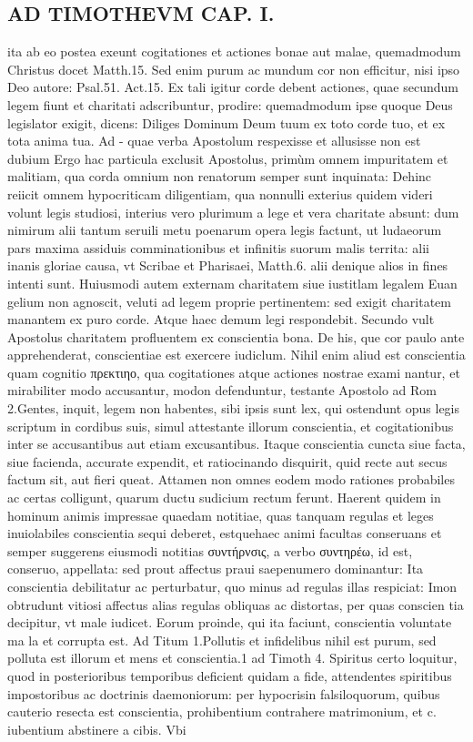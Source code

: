 \documentclass{article}
\begin{document}
\begin{pages}
\section*{AD TIMOTHEVM CAP. I. }
\marginpar{[ p.22 ]}\pstart ita ab eo postea exeunt cogitationes et actiones bonae aut malae, quemadmodum Christus docet Matth.15. Sed enim purum ac mundum cor non efficitur, nisi ipso Deo autore: Psal.51. Act.15. Ex tali igitur corde debent actiones, quae secundum legem fiunt et charitati adscribuntur, prodire: quemadmodum ipse quoque  Deus legislator exigit, dicens: Diliges Dominum Deum tuum ex toto corde tuo, et ex tota anima tua. Ad - quae verba Apostolum respexisse et allusisse non est dubium Ergo hac particula exclusit Apostolus, primùm omnem impuritatem et malitiam, qua corda omnium non renatorum semper sunt inquinata: Dehinc reiicit omnem hypocriticam diligentiam, qua nonnulli exterius quidem videri volunt legis studiosi, interius vero plurimum a lege et vera charitate absunt: dum nimirum alii tantum seruili metu poenarum opera legis factunt, ut ludaeorum pars maxima assiduis comminationibus et infinitis suorum malis territa: alii inanis gloriae causa, vt Scribae et Pharisaei, Matth.6. alii denique  alios in fines intenti sunt. Huiusmodi autem externam charitatem siue iustitlam legalem Euan gelium non agnoscit, veluti ad legem proprie pertinentem: sed exigit charitatem manantem ex puro corde. Atque  haec demum legi respondebit.  \pend\pstart Secundo vult Apostolus charitatem profluentem ex conscientia bona. De his, que cor paulo ante apprehenderat, conscientiae est exercere iudiclum. Nihil enim aliud est conscientia quam cognitio πρεκτιηο, qua cogitationes atque actiones nostrae exami nantur, et mirabiliter modo accusantur, modon defenduntur, testante Apostolo ad Rom 2.Gentes, inquit, legem non habentes, sibi ipsis sunt lex, qui ostendunt opus legis scriptum in cordibus suis, simul attestante illorum conscientia, et cogitationibus inter se   accusantibus aut etiam excusantibus. Itaque  conscientia cuncta siue facta, siue facienda, accurate expendit, et ratiocinando disquirit, quid recte aut secus factum sit, aut fieri queat. Attamen non omnes eodem modo rationes probabiles ac certas colligunt, quarum ductu sudicium rectum ferunt. Haerent quidem in hominum animis impressae quaedam notitiae, quas tanquam regulas et leges inuiolabiles conscientia sequi deberet, estquehaec animi facultas conseruans et semper suggerens eiusmodi notitias συντήρνσις, a verbo συντηρέω, id est, conseruo, appellata: sed prout affectus praui saepenumero dominantur: Ita conscientia debilitatur ac perturbatur, quo minus ad regulas illas respiciat: Imon obtrudunt vitiosi affectus alias regulas obliquas ac distortas, per quas conscien tia decipitur, vt male iudicet. Eorum proinde, qui ita faciunt, conscientia voluntate ma la et corrupta est. Ad Titum 1.Pollutis et infidelibus nihil est purum, sed polluta est illorum et mens et conscientia.1 ad Timoth 4. Spiritus certo loquitur, quod in posterioribus temporibus deficient quidam a fide, attendentes spiritibus impostoribus ac   doctrinis daemoniorum: per hypocrisin falsiloquorum, quibus cauterio resecta est conscientia, prohibentium contrahere matrimonium, et c. iubentium abstinere a cibis. Vbi 
\end{pages}
\end{document}
